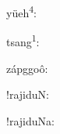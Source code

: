 \documentclass{scrartcl}
\begin{document}
yüeh\textsuperscript{4}: 

tsang\textsuperscript{1}: 

zápggoô: 

!rajiduN: 

!rajiduNa: 
\end{document}
